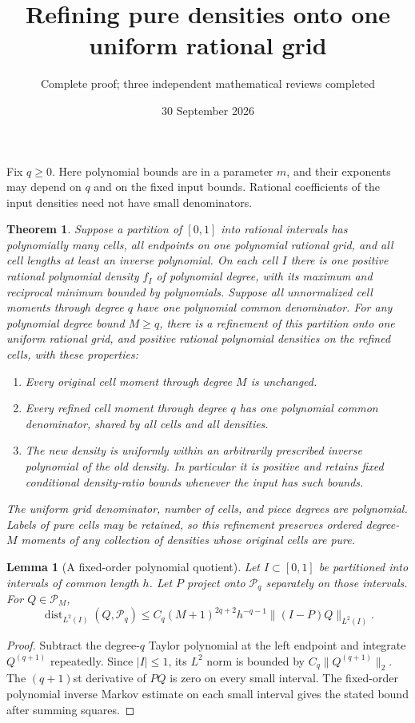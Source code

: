 \documentclass[11pt]{article}
\title{Refining pure densities onto one uniform rational grid}
\author{Complete proof; three independent mathematical reviews completed}
\date{30 September 2026}
\newtheorem{theorem}{Theorem}
\newtheorem{lemma}{Lemma}
\newcommand{\PP}{\mathcal P}
\begin{document}
\maketitle
Fix $q\ge0$. Here polynomial bounds are in a parameter $m$, and their
exponents may depend on $q$ and on the fixed input bounds. Rational
coefficients of the input densities need not have small denominators.

\begin{theorem}\label{main}
Suppose a partition of $[0,1]$ into rational intervals has polynomially
many cells, all endpoints on one polynomial rational grid, and all
cell lengths at least an inverse polynomial. On each cell $I$ there
is one positive rational polynomial density $f_I$ of polynomial degree,
with its maximum and reciprocal minimum bounded by polynomials.
Suppose all unnormalized cell moments through degree $q$ have one
polynomial common denominator.
For any polynomial degree bound $M\ge q$, there is a refinement of
this partition onto one uniform rational grid, and positive rational
polynomial densities on the refined cells, with these properties:
\begin{enumerate}
\item Every original cell moment through degree $M$ is unchanged.
\item Every refined cell moment through degree $q$ has one polynomial
common denominator, shared by all cells and all densities.
\item The new density is uniformly within an arbitrarily prescribed
inverse polynomial of the old density. In particular it is positive
and retains fixed conditional density-ratio bounds whenever the input
has such bounds.
\end{enumerate}
The uniform grid denominator, number of cells, and piece degrees are
polynomial. Labels of pure cells may be retained, so this refinement
preserves ordered degree-$M$ moments of any collection of densities
whose original cells are pure.
\end{theorem}

\begin{lemma}[A fixed-order polynomial quotient]\label{quotient}
Let $I\subset[0,1]$ be partitioned into intervals of common length
$h$. Let $P$ project onto $\PP_q$ separately on those intervals.
For $Q\in\PP_M$,
\[
 \operatorname{dist}_{L^2(I)}(Q,\PP_q)
 \le C_q(M+1)^{2q+2}h^{-q-1}\|(I-P)Q\|_{L^2(I)}.
\]
\end{lemma}
\begin{proof}
Subtract the degree-$q$ Taylor polynomial at the left endpoint and
integrate $Q^{(q+1)}$ repeatedly. Since $|I|\le1$, its $L^2$ norm
is bounded by $C_q\|Q^{(q+1)}\|_2$.
The $(q+1)$st derivative of $PQ$ is zero on every small interval.
The fixed-order polynomial inverse Markov estimate on each small
interval gives the stated bound after summing squares.
\end{proof}
\end{document}
